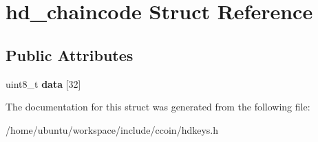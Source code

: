 \hypertarget{structhd__chaincode}{\section{hd\-\_\-chaincode Struct Reference}
\label{structhd__chaincode}
}
\subsection*{Public Attributes}
\begin{DoxyCompactItemize}
\item 
\hypertarget{structhd__chaincode_a2b9955f6e9440fab05fac834aa1715ea}{uint8\-\_\-t {\bfseries data} \mbox{[}32\mbox{]}}\label{structhd__chaincode_a2b9955f6e9440fab05fac834aa1715ea}

\end{DoxyCompactItemize}


The documentation for this struct was generated from the following file\-:\begin{DoxyCompactItemize}
\item 
/home/ubuntu/workspace/include/ccoin/hdkeys.\-h\end{DoxyCompactItemize}
